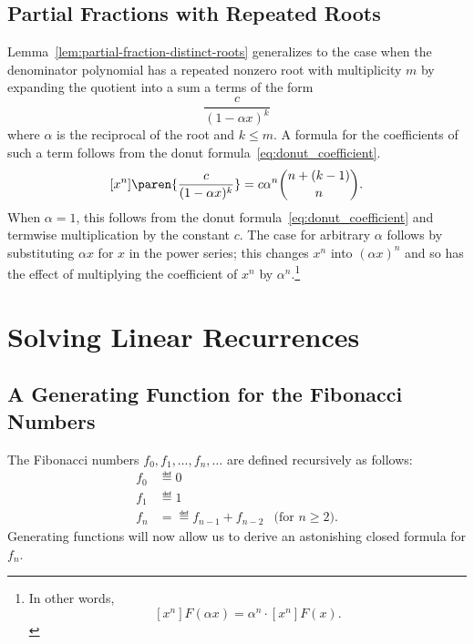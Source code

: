 \subsection{Partial Fractions with Repeated Roots}
Lemma~\ref{lem:partial-fraction-distinct-roots} generalizes to the
case when the denominator polynomial has a repeated nonzero root with
multiplicity $m$ by expanding the quotient into a sum a terms of the form
\[
\frac{c}{(1-\alpha x)^k}
\]
where $\alpha$ is the reciprocal of the root and $k \leq m$.
A formula for the coefficients of such a term follows
from the donut formula~\eqref{eq:donut_coefficient}.
\begin{equation}\label{c-alpha-k-coeff}
[x^n]\paren{\frac{c}{(1-\alpha x)^k}} = c \alpha^n \binom{n+(k-1)}{n}.
\end{equation}
When $\alpha = 1$, this follows from the donut
formula~\eqref{eq:donut_coefficient} and termwise multiplication by
the constant $c$.  The case for arbitrary $\alpha$ follows by
substituting $\alpha x$ for $x$ in the power series; this changes $x^n$ into
$(\alpha x)^n$ and so has the effect of multiplying the coefficient of
$x^n$ by $\alpha^n$.\footnote{In other words,
\[
[x^n]F(\alpha x) = \alpha^n \cdot [x^n]F(x).
\]}

\begin{problems}

\classproblems
{}

\homeworkproblems
{}

\examproblems
{}
\end{problems}

\section{Solving Linear Recurrences}\label{sec:fibonacci}

\subsection{A Generating Function for the Fibonacci Numbers}

The Fibonacci numbers $f_0,f_1,\dots,f_n,\dots$ are defined recursively
as follows:
\begin{align*}
f_0 & \eqdef 0 \\
f_1 & \eqdef 1 \\
f_n & =\eqdef f_{n-1} + f_{n-2}
   & \text{(for $n \geq 2$)}.
\end{align*}
Generating functions will now allow us to derive an astonishing closed formula for $f_n$.

